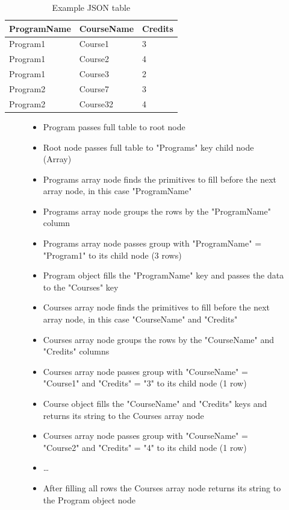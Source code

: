 \begin{table}[]
    \begin{tabular}{|lll|}
    \hline
    ProgramName & CourseName & Credits \\ \hline
    Program1    & Course1    & 3       \\
    Program1    & Course2    & 4       \\
    Program1    & Course3    & 2       \\
    Program2    & Course7    & 3       \\
    Program2    & Course32   & 4       \\ \hline
    \end{tabular}
    \caption{Example JSON table}
    \label{table:json_table}
\end{table}

\begin{figure}[]
    \begin{itemize}
        \item Program passes full table to root node
        \item Root node passes full table to "Programs" key child node (Array)
        \item Programs array node finds the primitives to fill before the next array node, in this case "ProgramName"
        \item Programs array node groups the rows by the "ProgramName" column
        \item Programs array node passes group with "ProgramName" = "Program1" to its child node (3 rows)
        \item Program object fills the "ProgramName" key and passes the data to the "Courses" key
        \item Courses array node finds the primitives to fill before the next array node, in this case "CourseName" and "Credits"
        \item Courses array node groups the rows by the "CourseName" and "Credits" columns
        \item Courses array node passes group with "CourseName" = "Course1" and "Credits" = "3" to its child node (1 row)
        \item Course object fills the "CourseName" and "Credits" keys and returns its string to the Courses array node
        \item Courses array node passes group with "CourseName" = "Course2" and "Credits" = "4" to its child node (1 row)
        \item \dots
        \item After filling all rows the Courses array node returns its string to the Program object node

\end{itemize}
\end{figure}
